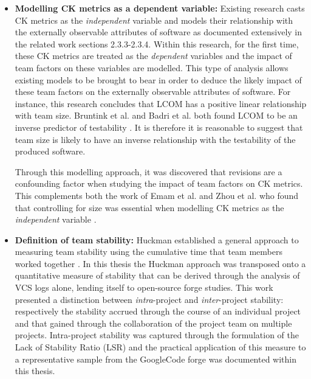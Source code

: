 \begin{itemize}
\item  \textbf{Modelling CK metrics as a dependent variable: } Existing research casts CK metrics as the \textit{independent} variable and models their relationship with the externally observable attributes of software as documented extensively in the related work sections 2.3.3-2.3.4. Within this research, for the first time, these CK metrics are treated as the \textit{dependent} variables and the impact of team factors on these variables are modelled. This type of analysis allows existing models to be brought to bear in order to deduce the likely impact of these team factors on the externally observable attributes of software. For instance, this research concludes that LCOM has a positive linear relationship with team size. Bruntink et al. and Badri et al. both found LCOM to be an inverse predictor of testability \citep{bruntink2006empirical, badri2011empirical}. It is therefore it is reasonable to suggest that team size is likely to have an inverse relationship with the testability of the produced software. 

Through this modelling approach, it was discovered that revisions are a confounding factor when studying the impact of team factors on CK metrics. This complements both the work of Emam et al. and Zhou et al. who found that controlling for size was essential when modelling CK metrics as the \textit{independent} variable  \citep{el2001prediction, zhou2006empirical}.

\item  \textbf{Definition of team stability: } Huckman established a general approach to measuring team stability using the cumulative time that team members worked together \citep{huckman2009team}. In this thesis the Huckman approach was transposed onto a quantitative measure of stability that can be derived through the analysis of VCS logs alone, lending itself to open-source forge studies. This work presented a distinction between \textit{intra}-project  and \textit{inter}-project stability: respectively the stability accrued through the course of an individual project and that gained through the collaboration of the project team on multiple projects. Intra-project stability was captured through the formulation of  the Lack of Stability Ratio (LSR) and the practical application of this measure to a representative sample from the GoogleCode forge was documented within this thesis.
\end{itemize}


